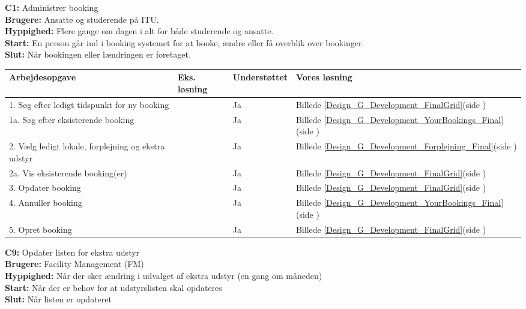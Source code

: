 \textbf{C1:} Administrer booking\\
\textbf{Brugere:} Ansatte og studerende på ITU.\\
\textbf{Hyppighed:} Flere gange om dagen i alt for både studerende og ansatte.\\
\textbf{Start:} En person går ind i booking systemet for at booke, ændre eller få overblik over bookinger.\\
\textbf{Slut:} Når bookingen eller lændringen er foretaget.

\begin{tabular}{ | p{7.5cm} | p{2.5cm} | p{2.2cm} | p{2.7cm} |}
\hline
\textbf{Arbejdesopgave} & \textbf{Eks. løsning} & \textbf{Understøttet}  & \textbf{Vores løsning}\\ 
\hline
1. Søg efter ledigt tidspunkt for ny booking & & Ja & Billede \ref{Design_G_Development_FinalGrid}(side \pageref{Design_G_Development_FinalGrid}) \\ 
\hline
1a. Søg efter eksisterende booking &  & Ja & Billede \ref{Design_G_Development_YourBookings_Final}(side \pageref{Design_G_Development_YourBookings_Final}) \\ 
\hline
2. Vælg ledigt lokale, forplejning og ekstra udstyr & & Ja & Billede \ref{Design_G_Development_Forplejning_Final}(side \pageref{Design_G_Development_Forplejning_Final})\\ 
\hline
2a. Vis eksisterende booking(er) & & Ja & Billede \ref{Design_G_Development_FinalGrid}(side \pageref{Design_G_Development_FinalGrid})\\ 
\hline
3. Opdater booking & & Ja & Billede \ref{Design_G_Development_FinalGrid}(side \pageref{Design_G_Development_FinalGrid})\\ 
\hline
4. Annuller booking & & Ja & Billede \ref{Design_G_Development_YourBookings_Final}(side \pageref{Design_G_Development_YourBookings_Final})\\ 
\hline
5. Opret booking & & Ja & Billede \ref{Design_G_Development_FinalGrid}(side \pageref{Design_G_Development_FinalGrid})\\ 
\hline
\end{tabular}

\textbf{C9:} Opdater listen for ekstra udstyr\\
\textbf{Brugere:} Facility Management (FM)\\
\textbf{Hyppighed:} Når der sker ændring i udvalget af ekstra udstyr (en gang om måneden)\\
\textbf{Start:} Når der er behov for at udstyrslisten skal opdateres\\
\textbf{Slut:} Når listen er opdateret

